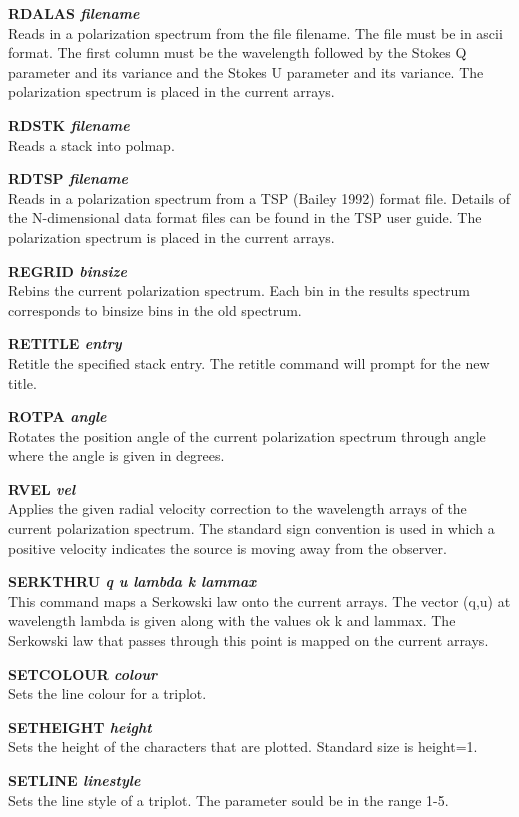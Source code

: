 {\bf RDALAS \it filename } \\
Reads in a polarization spectrum from the file filename. The file must
be in ascii format. The first column must be the wavelength followed
by the Stokes Q parameter and its variance and the Stokes U parameter
and its variance.  The polarization spectrum is placed in the current
arrays.

{\bf RDSTK \it filename } \\
Reads a stack into  polmap.

{\bf RDTSP \it filename } \\
Reads in a polarization spectrum from a  TSP (Bailey 1992) format file.
Details of the N-dimensional data format files can be found in the  TSP
user guide. The polarization spectrum is placed in the current arrays.

{\bf REGRID \it binsize} \\
Rebins the current polarization spectrum. Each bin in the results spectrum
corresponds to binsize bins in the old spectrum.

{\bf RETITLE \it entry} \\
Retitle the specified stack entry. The retitle command will prompt for the
new title.

{\bf ROTPA \it angle } \\
Rotates the position angle of the current polarization spectrum through 
angle where the angle is given in degrees.

{\bf RVEL \it vel} \\
Applies the given radial velocity correction to the wavelength arrays
of the current polarization spectrum. The standard sign convention is
used in which a positive velocity indicates the source is moving away
from the observer.

{\bf SERKTHRU \it q u lambda k lammax} \\
This command maps a Serkowski law onto the current arrays. The vector
(q,u) at wavelength lambda is given along with the values ok k and
lammax. The Serkowski law that passes through this point is mapped on
the current arrays.

{\bf SETCOLOUR \it colour} \\
Sets the line colour for a triplot.

{\bf SETHEIGHT \it height} \\
Sets the height of the characters that are plotted. Standard size is height=1.

{\bf SETLINE \it linestyle} \\
Sets the line style of a triplot. The parameter sould be in the range 1-5.

